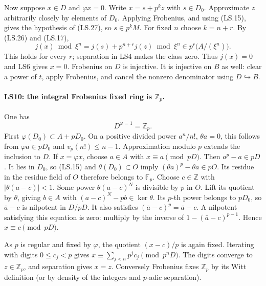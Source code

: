 Now suppose $x\in D$ and $\varphi x=0$. Write
$x=s+p^kz$ with $s\in D_0$. Approximate $z$ arbitrarily closely
by elements of $D_0$. Applying Frobenius, and using (LS.15), gives
the hypothesis of (LS.27), so $s\in p^kM$.
For fixed $n$ choose $k=n+r$. By (LS.26) and (LS.17),
\[
 j(x)\bmod\xi^n
   =j(s)+p^{n+r}j(z)\bmod\xi^n
     \in p^r\bigl(A/(\xi^n)\bigr).
\]
This holds for every $r$; separation in LS4 makes the class zero.
Thus $j(x)=0$ and LS6 gives $x=0$. Frobenius on $D$ is injective.
It is injective on $B$ as well: clear a power of $t$, apply
Frobenius, and cancel the nonzero denominator using $D\hookrightarrow B$.

\paragraph{LS10: the integral Frobenius fixed ring is $\mathbb Z_p$.}
One has
\[
                         D^{\varphi=1}=\mathbb Z_p. \tag{LS.29}
\]
First $\varphi(D_0)\subset A+pD_0$. On a positive divided power
$a^n/n!$, $\theta a=0$, this follows from
$\varphi a\in pD_0$ and $v_p(n!)\le n-1$.
Approximation modulo $p$ extends the inclusion to $D$.
If $x=\varphi x$, choose $a\in A$ with $x\equiv a\pmod{pD}$.
Then $a^p-a\in pD$. It lies in $D_0$, so (LS.15) and
$\theta(D_0)\subset O$ imply
$(\theta a)^p-\theta a\in pO$. Its residue in the residue field
of $O$ therefore belongs to $\mathbb F_p$.
Choose $c\in\mathbb Z$ with $|\theta(a-c)|<1$.
Some power $\theta(a-c)^N$ is divisible by $p$ in $O$.
Lift its quotient by $\theta$, giving $b\in A$ with
$(a-c)^N-pb\in\ker\theta$. Its $p$-th power belongs to $pD_0$,
so $\bar a-c$ is nilpotent in $D/pD$. It also satisfies
$(\bar a-c)^p=\bar a-c$. A nilpotent satisfying this equation is
zero: multiply by the inverse of $1-(\bar a-c)^{p-1}$.
Hence $x\equiv c\pmod{pD}$.

As $p$ is regular and fixed by $\varphi$, the quotient $(x-c)/p$
is again fixed. Iterating with digits $0\le c_j<p$ gives
$x\equiv\sum_{j<n}p^jc_j\pmod{p^nD}$.
The digits converge to $z\in\mathbb Z_p$, and separation gives
$x=z$. Conversely Frobenius fixes $\mathbb Z_p$ by its Witt
definition (or by density of the integers and $p$-adic separation).

